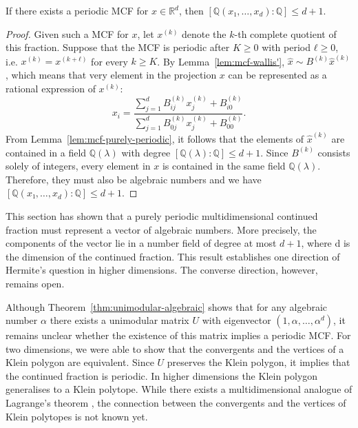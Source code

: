 \begin{theorem}
  \label{thm:mdcf-periodic}
  If there exists a periodic MCF for $x ∈ ℝ^d$,
  then $[ℚ(x₁, …, x_d) : ℚ] ≤ d + 1$.
\end{theorem}

\begin{proof}
  Given such a MCF for $x$, let $x^{(k)}$ denote the $k$-th complete quotient
  of this fraction.
  Suppose that the MCF is periodic after $K ≥ 0$ with period $ℓ ≥ 0$, i.e.
  $x^{(k)} = x^{(k+ℓ)}$ for every $k ≥ K$.
  By Lemma~\ref{lem:mcf-wallis'}, $\hat x \sim B^{(k)} \hat x^{(k)}$,
  which means that very element in the projection $x$ can be represented
  as a rational expression of $x^{(k)}$:
  \[
    x_i = \frac{∑_{j=1}^d B_{ij}^{(k)} x_j^{(k)} + B_{i0}^{(k)}}{\sum_{j=1}^d B_{0j}^{(k)} x_j^{(k)} + B_{00}^{(k)}}.
  \]
  From Lemma~\ref{lem:mcf-purely-periodic},
  it follows that the elements of $\hat x^{(k)}$
  are contained in a field $ℚ(λ)$ with degree $[ℚ(λ) : ℚ] ≤ d+1$.
  Since $B^{(k)}$ consists solely of integers, every element in $x$ is contained in the same field $ℚ(λ)$.
  Therefore, they must also be algebraic numbers
  and we have $[ℚ(x₁, …, x_d) : ℚ] ≤ d+1$.
\end{proof}

This section has shown that a purely periodic multidimensional continued fraction must represent a vector of algebraic numbers.
More precisely, the components of the vector lie in a number field of degree at
most $d + 1$, where d is the dimension of the continued fraction.
This result establishes one direction of Hermite's question in higher dimensions.
The converse direction, however, remains open.

Although Theorem~\ref{thm:unimodular-algebraic} shows that for any algebraic
number $α$ there exists a unimodular matrix $U$ with eigenvector $(1, α, …, α^d)$,
it remains unclear whether the existence of this matrix implies a periodic MCF.
For two dimensions, we were able to show that the convergents and the vertices of a Klein polygon are equivalent.
Since $U$ preserves the Klein polygon, it implies that the continued fraction is periodic.
In higher dimensions the Klein polygon generalises to a Klein polytope.
While there exists a multidimensional analogue of Lagrange's theorem \cite{German08},
the connection between the convergents and the vertices of Klein polytopes is not known yet.
